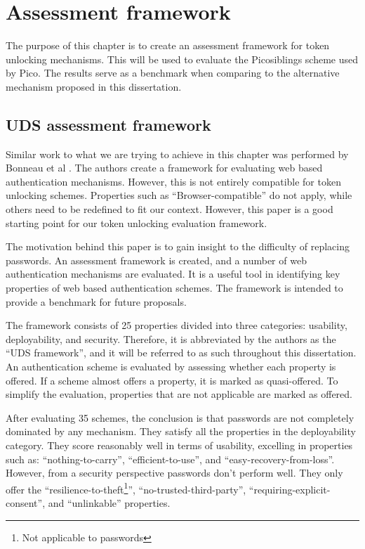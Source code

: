 
\chapter{Assessment framework}

\label{Chapter3}


The purpose of this chapter is to create an assessment framework for token unlocking mechanisms. This will be used to evaluate the Picosiblings scheme used by Pico. The results serve as a benchmark when comparing to the alternative mechanism proposed in this dissertation.

\section{UDS assessment framework}

Similar work to what we are trying to achieve in this chapter was performed by Bonneau et al \cite{bonneau2012quest}. The authors create a framework for evaluating web based authentication mechanisms. However, this is not entirely compatible for token unlocking schemes. Properties such as ``Browser-compatible'' do not apply, while others need to be redefined to fit our context. However, this paper is a good starting point for our token unlocking evaluation framework.

The motivation behind this paper is to gain insight to the difficulty of replacing passwords. An assessment framework is created, and a number of web authentication mechanisms are evaluated. It is a useful tool in identifying key properties of web based authentication schemes. The framework is intended to provide a benchmark for future proposals.

The framework consists of 25 properties divided into three categories: usability, deployability, and security. Therefore, it is abbreviated by the authors as the ``UDS framework'', and it will be referred to as such throughout this dissertation. An authentication scheme is evaluated by assessing whether each property is offered. If a scheme almost offers a property, it is marked as quasi-offered. To simplify the evaluation, properties that are not applicable are marked as offered.

After evaluating 35 schemes, the conclusion is that passwords are not completely dominated by any mechanism. They satisfy all the properties in the deployability category. They score reasonably well in terms of usability, excelling in properties such as: ``nothing-to-carry'', ``efficient-to-use'', and ``easy-recovery-from-loss''. However, from a security perspective passwords don't perform well. They only offer the ``resilience-to-theft\footnote{Not applicable to passwords}'', ``no-trusted-third-party'', ``requiring-explicit-consent'', and ``unlinkable'' properties.

